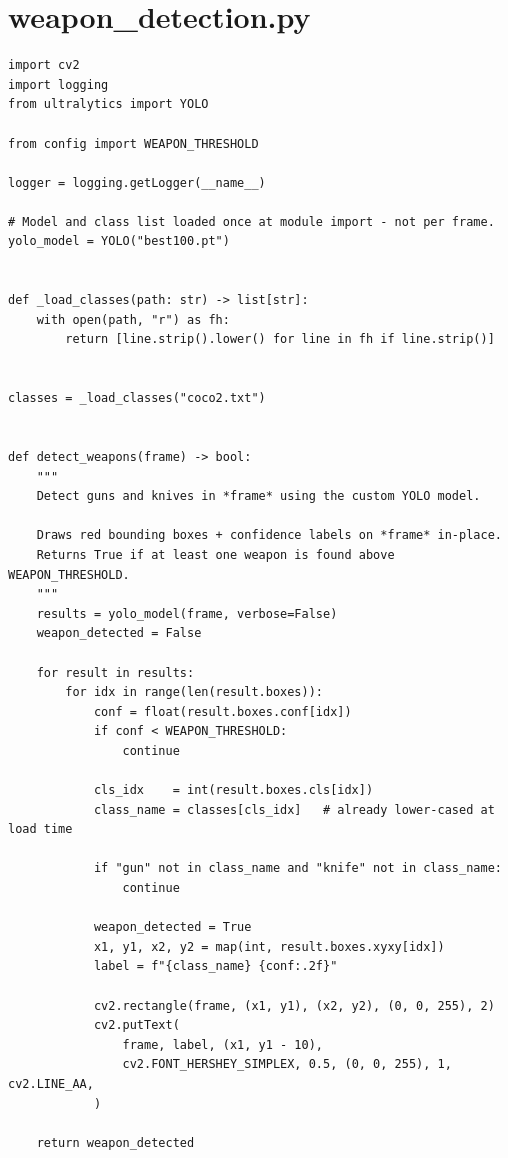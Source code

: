 \documentclass[12pt,a4paper]{report}
\begin{document}
\section{weapon\_detection.py}
\begin{lstlisting}
import cv2
import logging
from ultralytics import YOLO

from config import WEAPON_THRESHOLD

logger = logging.getLogger(__name__)

# Model and class list loaded once at module import - not per frame.
yolo_model = YOLO("best100.pt")


def _load_classes(path: str) -> list[str]:
    with open(path, "r") as fh:
        return [line.strip().lower() for line in fh if line.strip()]


classes = _load_classes("coco2.txt")


def detect_weapons(frame) -> bool:
    """
    Detect guns and knives in *frame* using the custom YOLO model.

    Draws red bounding boxes + confidence labels on *frame* in-place.
    Returns True if at least one weapon is found above WEAPON_THRESHOLD.
    """
    results = yolo_model(frame, verbose=False)
    weapon_detected = False

    for result in results:
        for idx in range(len(result.boxes)):
            conf = float(result.boxes.conf[idx])
            if conf < WEAPON_THRESHOLD:
                continue

            cls_idx    = int(result.boxes.cls[idx])
            class_name = classes[cls_idx]   # already lower-cased at load time

            if "gun" not in class_name and "knife" not in class_name:
                continue

            weapon_detected = True
            x1, y1, x2, y2 = map(int, result.boxes.xyxy[idx])
            label = f"{class_name} {conf:.2f}"

            cv2.rectangle(frame, (x1, y1), (x2, y2), (0, 0, 255), 2)
            cv2.putText(
                frame, label, (x1, y1 - 10),
                cv2.FONT_HERSHEY_SIMPLEX, 0.5, (0, 0, 255), 1, cv2.LINE_AA,
            )

    return weapon_detected
\end{lstlisting}

\end{document}
